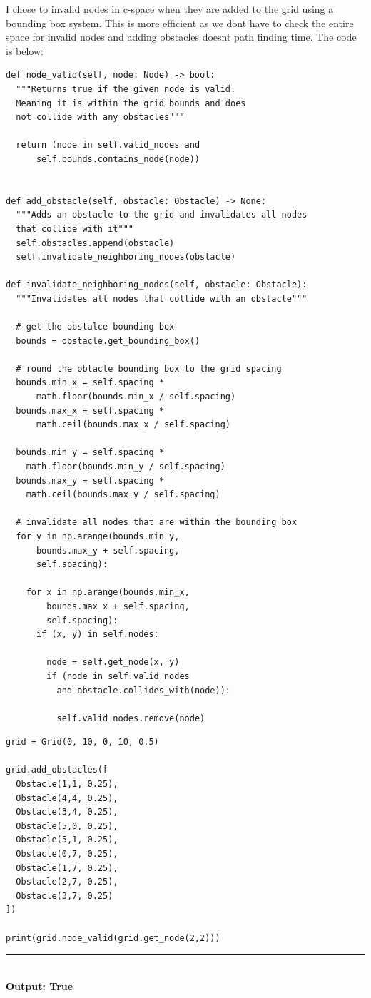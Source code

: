 \documentclass{article}
\begin{document}
\bigskip
I chose to invalid nodes in c-space when they are added to the grid using a bounding box system.
This is more efficient as we dont have to check the entire space for invalid nodes and adding obstacles
doesnt path finding time. The code is below:
\bigskip
\begin{mdframed}[backgroundcolor=bg]
\begin{verbatim}
def node_valid(self, node: Node) -> bool:
  """Returns true if the given node is valid. 
  Meaning it is within the grid bounds and does 
  not collide with any obstacles"""

  return (node in self.valid_nodes and 
      self.bounds.contains_node(node))


def add_obstacle(self, obstacle: Obstacle) -> None:
  """Adds an obstacle to the grid and invalidates all nodes 
  that collide with it"""
  self.obstacles.append(obstacle)
  self.invalidate_neighboring_nodes(obstacle)

def invalidate_neighboring_nodes(self, obstacle: Obstacle):
  """Invalidates all nodes that collide with an obstacle"""

  # get the obstalce bounding box
  bounds = obstacle.get_bounding_box()

  # round the obtacle bounding box to the grid spacing
  bounds.min_x = self.spacing * 
      math.floor(bounds.min_x / self.spacing)
  bounds.max_x = self.spacing * 
      math.ceil(bounds.max_x / self.spacing)

  bounds.min_y = self.spacing * 
    math.floor(bounds.min_y / self.spacing)
  bounds.max_y = self.spacing *
    math.ceil(bounds.max_y / self.spacing)

  # invalidate all nodes that are within the bounding box
  for y in np.arange(bounds.min_y, 
      bounds.max_y + self.spacing, 
      self.spacing):
    
    for x in np.arange(bounds.min_x, 
        bounds.max_x + self.spacing, 
        self.spacing):
      if (x, y) in self.nodes:

        node = self.get_node(x, y)
        if (node in self.valid_nodes 
          and obstacle.collides_with(node)):

          self.valid_nodes.remove(node)

\end{verbatim}
\end{mdframed}

\begin{mdframed}[backgroundcolor=bg]
\begin{verbatim}
grid = Grid(0, 10, 0, 10, 0.5)

grid.add_obstacles([
  Obstacle(1,1, 0.25),
  Obstacle(4,4, 0.25),
  Obstacle(3,4, 0.25),
  Obstacle(5,0, 0.25),
  Obstacle(5,1, 0.25),
  Obstacle(0,7, 0.25),
  Obstacle(1,7, 0.25),
  Obstacle(2,7, 0.25),
  Obstacle(3,7, 0.25)
])

print(grid.node_valid(grid.get_node(2,2)))
\end{verbatim}
\end{mdframed}
\noindent\rule{\textwidth}{0.4pt}\\
\textbf{Output: True}
\end{document}
